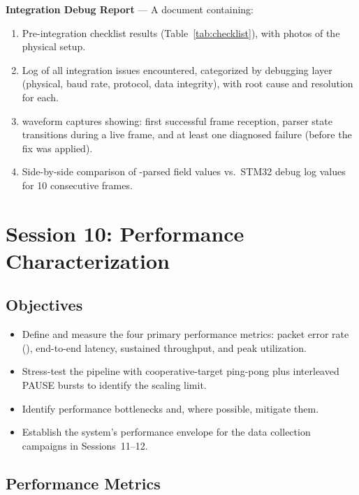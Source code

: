 \documentclass[11pt,letterpaper]{article}
\begin{document}
	\begin{tcolorbox}[deliverable={Session 9 Deliverable}]
		\textbf{Integration Debug Report} --- A document containing:
		\begin{enumerate}
			\item Pre-integration checklist results (Table~\ref{tab:checklist}), with photos of the physical setup.
			\item Log of all integration issues encountered, categorized by debugging layer (physical, baud rate, protocol, data integrity), with root cause and resolution for each.
			\item \ILA{} waveform captures showing: first successful frame reception, parser state transitions during a live frame, and at least one diagnosed failure (before the fix was applied).
			\item Side-by-side comparison of \FPGA{}-parsed field values vs.\ STM32 debug log values for 10 consecutive frames.
		\end{enumerate}
	\end{tcolorbox}

	\newpage
	\section{Session 10: Performance Characterization}
	\label{sec:performance}

	\subsection{Objectives}

	\begin{itemize}[leftmargin=2em]
		\item Define and measure the four primary performance metrics: packet error rate (\PER{}), end-to-end latency, sustained throughput, and \FIFO{} peak utilization.
		\item Stress-test the pipeline with cooperative-target ping-pong plus interleaved PAUSE bursts to identify the scaling limit.
		\item Identify performance bottlenecks and, where possible, mitigate them.
		\item Establish the system's performance envelope for the data collection campaigns in Sessions~11--12.
	\end{itemize}

	\subsection{Performance Metrics}
\end{document}
